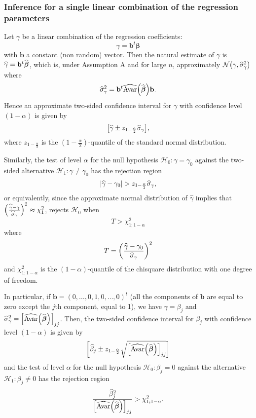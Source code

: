 \subsubsection{Inference for a single linear combination of the regression
parameters}

Let $\gamma$ be a linear combination of the regression coefficients:
\[
\gamma=\mathbf{b}^{t}\boldsymbol\beta%
\]
with $\mathbf{b}$ a constant (non random) vector. Then the natural estimate of
$\gamma$ is $\widehat{\gamma}=\mathbf{b}^{t}\widehat{\boldsymbol\beta}$,
which is, under Assumption A and for large $n$, approximately $\mathcal{N}%
\left(  \gamma,\sthat{\sigma}_{\gamma}^{2}\right)  $ where
\[
\sthat{\sigma}_{\gamma}^{2}=\mathbf{b}^{t}\sthat{\mathrm{Avar}}\left(
\sthat{\boldsymbol\beta}\right)  \mathbf{b}.
\]
Hence an approximate two-sided confidence interval for $\gamma$ with
confidence level $\left(  1-\alpha\right)  $ is given by
\[
\left[  \sthat{\gamma}\pm z_{1-\frac{\alpha}{2}}\sthat{\sigma}_{\gamma
}\right]  ,
\]
where $z_{1-\frac{\alpha}{2}}$ is the $\left(  1-\frac{\alpha}{2}\right)
$-quantile of the standard normal distribution.

Similarly, the test of level $\alpha$ for the null hypothesis $\mathcal{H}%
_{0}:\gamma=\gamma_{0}$ against the two-sided alternative $\mathcal{H}%
_{1}:\gamma\neq\gamma_{0}$ has the rejection region
\[
\left\vert \sthat{\gamma}-\gamma_{0}\right\vert >z_{1-\frac{\alpha}{2}%
}\sthat{\sigma}_{\gamma},
\]
or equivalently, since the approximate normal distribution of $\widehat
{\gamma}$ implies that $\left(  \frac{\sthat{\gamma}-\gamma}{\widehat
{\sigma}_{\gamma}}\right)  ^{2}\approx\chi_{1}^{2}$, rejects $\mathcal{H}_{0}$
when
\[
T>\chi_{1;1-\alpha}^{2}%
\]
where
\[
T=\left(  \frac{\sthat{\gamma}-\gamma_{0}}{\sthat{\sigma}_{\gamma}%
}\right)  ^{2}%
\]
and $\chi_{1;1-\alpha}^{2}$ is the $\left(  1-\alpha\right)  $-quantile of the
chisquare distribution with one degree of freedom.

In particular, if $\mathbf{b}=(0,\ldots,0,1,0,\ldots,0)^{t}$ (all the
components of $\mathbf{b}$ are equal to zero except the $j$th component, equal
to 1), we have $\gamma=\beta_{j}$ and $\sthat{\sigma}_{\gamma}^{2}=\left[
\sthat{\mathrm{Avar}}\left(  \sthat{\boldsymbol\beta}\right)  \right]
_{jj}$. Then, the two-sided confidence interval for $\beta_{j}$ with
confidence level $\left(  1-\alpha\right)  $ is given by
\[
\left[  \sthat{\beta}_{j}\pm z_{1-\frac{\alpha}{2}}\sqrt{\left[
\sthat{\mathrm{Avar}}\left(  \sthat{\boldsymbol\beta}\right)  \right]
_{jj}}\right]
\]
and the test of level $\alpha$ for the null hypothesis $\mathcal{H}_{0}%
:\beta_{j}=0$ against the alternative $\mathcal{H}_{1}:\beta_{j}\neq0$ has the
rejection region
\[
\frac{\sthat{\beta}_{j}^{2}}{\left[  \sthat{\mathrm{Avar}}\left(
\sthat{\boldsymbol\beta}\right)  \right]  _{jj}}>\chi_{1;1-\alpha}^{2}.
\]


